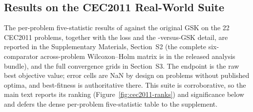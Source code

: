 \subsection{Results on the CEC2011 Real-World Suite}\label{sec:exp:cec2011}

The per-problem five-statistic results of \dtgsk{} against the original
GSK on the 22 CEC2011 problems, together with the \egsk{} loss and the
\dtgsk{}-versus-GSK detail, are reported in the Supplementary Materials,
Section~S2 (the complete six-comparator across-problem Wilcoxon--Holm
matrix is in the released analysis bundle), and the full convergence grids
in Section~S3. The endpoint is the raw best objective value; error cells
are NaN by design on problems without published optima, and best-fitness
is authoritative there. This suite is corroborative, so the main text
reports its ranking (Figure~\ref{fig:cec2011-ranks}) and significance
below and defers the dense per-problem five-statistic table to the
supplement.

